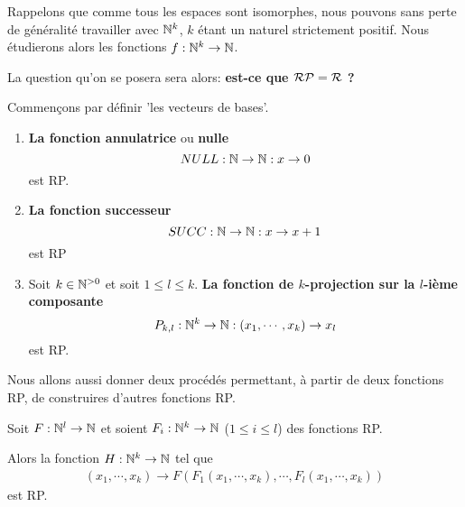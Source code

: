 Rappelons que comme tous les espaces sont isomorphes, nous pouvons sans perte de
généralité travailler avec $\mathbb{N}^{k}$, $k$ étant un naturel strictement
positif. Nous étudierons alors les fonctions
$f : \mathbb{N}^{k} \rightarrow \mathbb{N}$.

\vspace{5mm}

La question qu'on se posera sera alors: \textbf{est-ce que
$\mathcal{RP} = \mathcal{R}$ ?}

\vspace{5mm}

Commençons par définir 'les vecteurs de bases'.

\begin{enumerate}
	\item \textbf{La fonction annulatrice} ou \textbf{nulle}
		\begin{equation}
			NULL : \mathbb{N} \rightarrow \mathbb{N} : x \rightarrow 0
		\end{equation}
		est RP.
	\item \textbf{La fonction successeur}
		\begin{equation}
			SUCC : \mathbb{N} \rightarrow \mathbb{N} : x \rightarrow x + 1
		\end{equation}
		est RP
	\item Soit $k \in \mathbb{N}^{> 0}$ et soit $1 \leq l \leq k$. \textbf{La
		fonction de $k$-projection sur la $l$-ième composante}
		\begin{equation}
			P_{k, l} : \mathbb{N}^{k} \rightarrow \mathbb{N} : (x_{1}, \cdots, x_{k}) \rightarrow x_{l}
		\end{equation}
		est RP.
\end{enumerate}

\vspace{5mm}

Nous allons aussi donner deux procédés permettant, à partir de deux fonctions
RP, de construires d'autres fonctions RP.

\begin{definition} 
	Soit $F : \mathbb{N}^{l} \rightarrow \mathbb{N}$ et soient
	$F_{i} : \mathbb{N}^{k} \rightarrow \mathbb{N}$ ($1 \leq i \leq l$) des
	fonctions RP.

	Alors la fonction $H : \mathbb{N}^{k} \rightarrow \mathbb{N}$ tel que
	\begin{align}
		(x_{1}, \cdots, x_{k}) \rightarrow F(F_{1}(x_{1}, \cdots, x_{k}), \cdots, F_{l}(x_{1}, \cdots, x_{k}))
	\end{align}
	est RP.
\end{definition}


